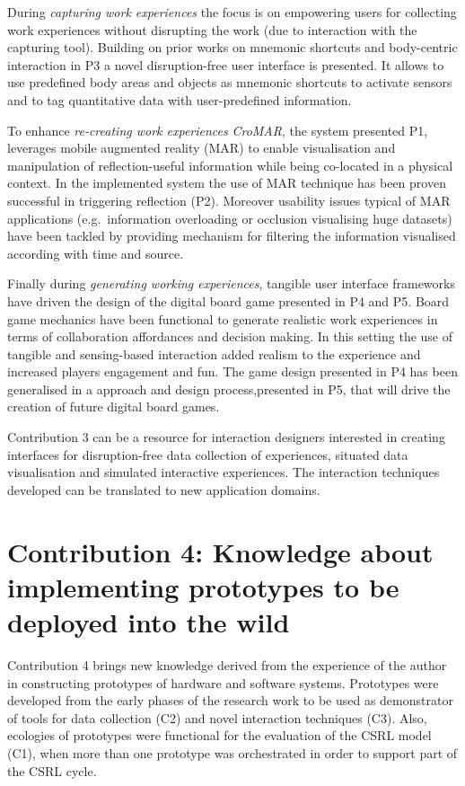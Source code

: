 During \emph{capturing work experiences} the focus is on empowering users for collecting work experiences without disrupting the work (due to interaction with the capturing tool). Building on prior works on mnemonic shortcuts \autocite{Guerreiro:2008wt} and body-centric interaction \autocite{Chen:2012wk} in P3 a novel disruption-free user interface is presented. It allows to use predefined body areas and objects as mnemonic shortcuts to activate sensors and to tag quantitative data with user-predefined information.

To enhance \emph{re-creating work experiences} \emph{CroMAR}, the system presented P1, leverages mobile augmented reality (MAR) to enable visualisation and manipulation of reflection-useful information while being co-located in a physical context. In the implemented system the use of MAR technique has been proven successful in triggering reflection (P2). Moreover usability issues typical of MAR applications (e.g.~information overloading or occlusion visualising huge datasets) have been tackled by providing mechanism for filtering the information visualised according with time and source.

Finally during \emph{generating working experiences}, tangible user interface frameworks have driven the design of the digital board game presented in P4 and P5. Board game mechanics have been functional to generate realistic work experiences in terms of collaboration affordances and decision making. In this setting the use of tangible and sensing-based interaction added realism to the experience and increased players engagement and fun. The game design presented in P4 has been generalised in a approach and design process,presented in P5, that will drive the creation of future digital board games.

Contribution 3 can be a resource for interaction designers interested in creating interfaces for disruption-free data collection of experiences, situated data visualisation and simulated interactive experiences. The interaction techniques developed can be translated to new application domains.

\section{Contribution 4: Knowledge about implementing prototypes to be deployed into the wild}\label{c4-knowledge-about-implementing-prototypes-to-be-deployed-into-the-wild}

Contribution 4 brings new knowledge derived from the experience of the author in constructing prototypes of hardware and software systems. Prototypes were developed from the early phases of the research work to be used as demonstrator of tools for data collection (C2) and novel interaction techniques (C3). Also, ecologies of prototypes were functional for the evaluation of the CSRL model (C1), when more than one prototype was orchestrated in order to support part of the CSRL cycle.

